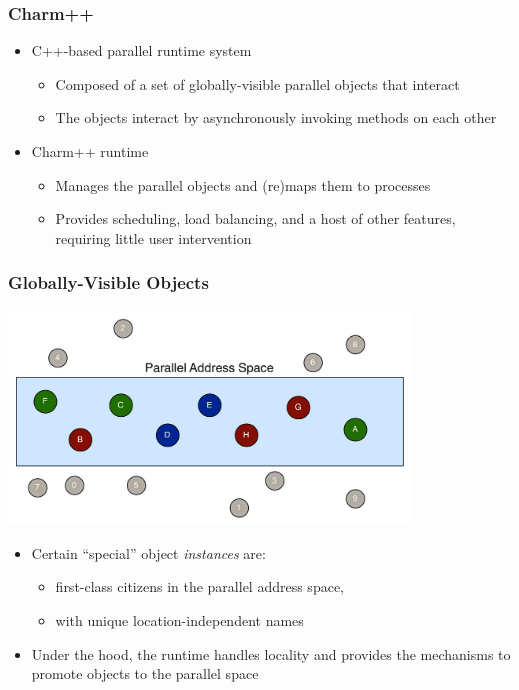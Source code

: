 \begin{frame}[fragile]
  \frametitle{Charm++}
  \begin{itemize}
    \item C++-based parallel runtime system
      \begin{itemize}
      \item Composed of a set of globally-visible parallel objects that interact
      \item The objects interact by asynchronously invoking methods on each other
      \end{itemize}
    \item Charm++ runtime
      \begin{itemize}
      \item Manages the parallel objects and (re)maps them to processes
      \item Provides scheduling, load balancing, and a host of other features,
        requiring little user intervention
      \end{itemize}
  \end{itemize}
\end{frame}

\begin{frame}[fragile]
  \frametitle{Globally-Visible Objects}
  \begin{center}
    \includegraphics[width=0.8\textwidth]{figures/objectGlobalAddress.pdf}
  \end{center}
  \begin{itemize}
    \item Certain ``special'' object \emph{instances} are:
      \begin{itemize}
      \item first-class citizens in the parallel address space,
      \item with unique location-independent names
      \end{itemize}
    \item Under the hood, the runtime handles locality and provides the
      mechanisms to promote objects to the parallel space
  \end{itemize}
\end{frame}

